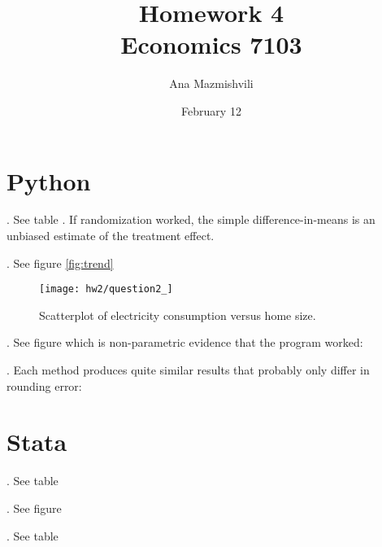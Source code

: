 \documentclass{article}
\title{Homework 4 \\ Economics 7103}
\author{Ana Mazmishvili}
\date{February 12}
\begin{document}
  
\maketitle

\section{Python}
. See table .  If randomization worked, the simple difference-in-means is an unbiased estimate of the treatment effect.

. See figure \ref{fig:trend}

\begin{figure}[h]
    \centering
    \texttt{[image: hw2/question2\_]}
    \caption{Scatterplot of electricity consumption versus home size.}
    \label{fig:scatter}
\end{figure}


. See figure  which is non-parametric evidence that the program worked:


. Each method produces quite similar results that probably only differ in rounding error:


\section{Stata}

. See table 



. See figure 



. See table 
\end{document}
